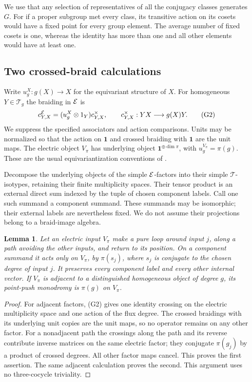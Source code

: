 \documentclass[10pt]{amsart}
\newcommand{\one}{\mathbf1}\newcommand{\C}{\mathcal C}
\newtheorem{lemma}[theorem]{Lemma}
\begin{document}
We use that any selection of representatives of all the
conjugacy classes generates $G$. For if a proper subgroup met
every class, its transitive action on its cosets would have a
fixed point for every group element. The average number of
fixed cosets is one, whereas the identity has more than one
and all other elements would have at least one. 

\subsection{Two crossed-braid calculations}
Write $u_g^X:g(X)\to X$ for the equivariant structure of $X$.
For homogeneous $Y\in\mathcal T_g$ the braiding in $\mathcal E$ is
\[
 c^\mathcal E_{Y,X}=(u_g^X\otimes1_Y)c^\times_{Y,X},
 \qquad c^\times_{Y,X}:YX\longrightarrow g(X)Y.          \tag{G2}
\]
We suppress the specified associators and action comparisons.
Units may be normalized so that the action on $\one$ and
crossed braiding with $\one$ are the unit maps.
The electric object $V_\pi$ has underlying object
$\one^{\oplus\dim\pi}$, with $u_g^{V_\pi}=\pi(g)$.
These are the usual equivariantization conventions of
\cite[Sections 3.2--3.4]{CGPW}.

Decompose the underlying objects of the simple $\mathcal E$-factors
into their simple $\mathcal T$-isotypes, retaining their finite
multiplicity spaces. Their tensor product is an external
direct sum indexed by the tuple of chosen component labels.
Call one such summand a component summand. These summands may
be isomorphic; their external labels are nevertheless fixed.
We do not assume their projections belong to a braid-image algebra.

\begin{lemma}\label{electric}
Let an electric input $V_\pi$ make a pure loop around input $j$,
along a path avoiding the other inputs, and return to its position.
On a component summand it acts only on $V_\pi$, by $\pi(s_j)$,
where $s_j$ is conjugate to the chosen degree of input $j$.
It preserves every component label and every other internal vector.
If $V_\pi$ is adjacent to a distinguished homogeneous object
of degree $g$, its point-push monodromy is $\pi(g)$ on $V_\pi$.
\end{lemma}
\begin{proof}
For adjacent factors, (G2) gives one identity crossing on the
electric multiplicity space and one action of the flux degree.
The crossed braidings with its underlying unit copies are the
unit maps, so no operator remains on any other factor.
For a nonadjacent path the crossings along the path and its
reverse contribute inverse matrices on the same electric factor;
they conjugate $\pi(g_j)$ by a product of crossed degrees.
All other factor maps cancel. This proves the first assertion.
The same adjacent calculation proves the second.
This argument uses no three-cocycle triviality.
\end{proof}
\end{document}
